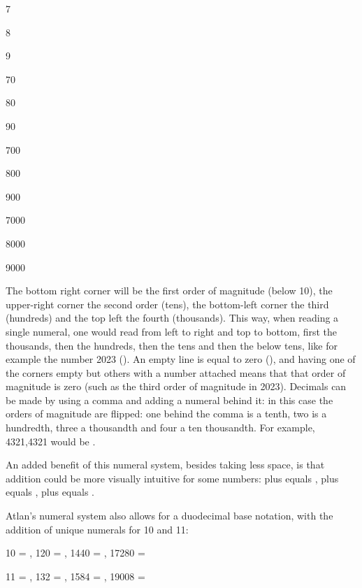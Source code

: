 \begin{multicols}{4}
\small
7   

8   

9   	
\columnbreak

70   

80   

90   


\columnbreak

700   

800   

900   

\columnbreak

7000   

8000   

9000   



\end{multicols}

The bottom right corner will be the first order of magnitude (below 10), the upper-right corner the second order (tens), the bottom-left corner the third (hundreds) and the top left the fourth (thousands). This way, when reading a single numeral, one would read from left to right and top to bottom, first the thousands, then the hundreds, then the tens and then the below tens, like for example the number 2023 (). An empty line is equal to zero (), and having one of the corners empty but others with a number attached means that that order of magnitude is zero (such as the third order of magnitude in 2023). Decimals can be made by using a comma and adding a numeral behind it: in this case the orders of magnitude are flipped: one behind the comma is a tenth, two is a hundredth, three a thousandth and four a ten thousandth. For example, 4321,4321 would be \comma{}. 

An added benefit of this numeral system, besides taking less space, is that addition could be more visually intuitive for some numbers:  plus  equals ,  plus  equals ,  plus  equals . 

Atlan’s numeral system also allows for a duodecimal base notation, with the addition of unique numerals for 10 and 11: 

\vspace{0.2cm}
{\small
10 = , 120 = , 1440 = , 17280 =  

11 = , 132 = , 1584 = , 19008 =  
}
\vspace{0.2cm}

